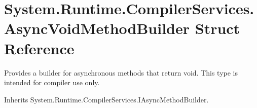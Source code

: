 \hypertarget{struct_system_1_1_runtime_1_1_compiler_services_1_1_async_void_method_builder}{}\section{System.\+Runtime.\+Compiler\+Services.\+Async\+Void\+Method\+Builder Struct Reference}
\label{struct_system_1_1_runtime_1_1_compiler_services_1_1_async_void_method_builder}


Provides a builder for asynchronous methods that return void. This type is intended for compiler use only.  




Inherits System.\+Runtime.\+Compiler\+Services.\+I\+Async\+Method\+Builder.

